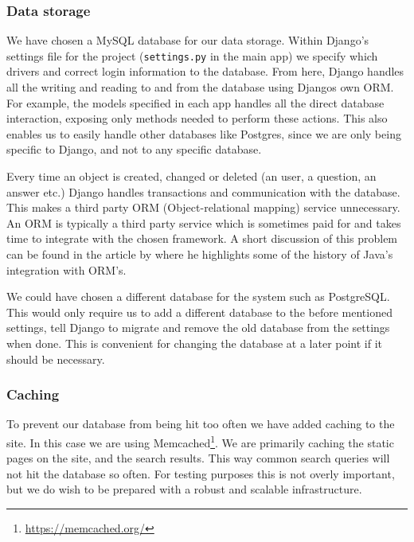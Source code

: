 
\subsubsection*{Data storage}
We have chosen a MySQL database for our data storage. Within Django's settings file for the project (\texttt{settings.py} in the main app) we specify which drivers and correct login information to the database. From here, Django handles all the writing and reading to and from the database using Djangos own ORM. For example, the models specified in each app handles all the direct database interaction, exposing only methods needed to perform these actions. This also enables us to easily handle other databases like Postgres, since we are only being specific to Django, and not to any specific database.

Every time an object is created, changed or deleted (an user, a question, an answer etc.) Django handles transactions and communication with the database. This makes a third party ORM (Object-relational mapping) service unnecessary. An ORM is typically a third party service which is sometimes paid for and takes time to integrate with the chosen framework. A short discussion of this problem can be found in the article by  where he highlights some of the history of Java's integration with ORM's.

We could have chosen a different database for the system such as PostgreSQL. This would only require us to add a different database to the before mentioned settings, tell Django to migrate and remove the old database from the settings when done. This is convenient for changing the database at a later point if it should be necessary.

\subsubsection*{Caching}
To prevent our database from being hit too often we have added caching to the site. In this case we are using Memcached\footnote{\url{https://memcached.org/}}. We are primarily caching the static pages on the site, and the search results. This way common search queries will not hit the database so often. For testing purposes this is not overly important, but we do wish to be prepared with a robust and scalable infrastructure.

